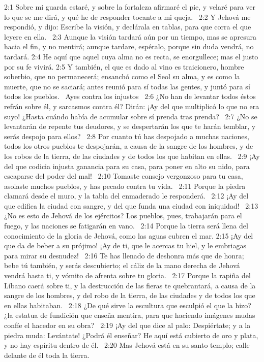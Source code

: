 2:1 Sobre mi guarda estaré, y sobre la fortaleza afirmaré el pie, y velaré para ver lo que se me dirá, y qué he de responder tocante a mi queja.  
2:2 Y Jehová me respondió, y dijo: Escribe la visión, y declárala en tablas, para que corra el que leyere en ella.  
2:3 Aunque la visión tardará aún por un tiempo, mas se apresura hacia el fin, y no mentirá; aunque tardare, espéralo, porque sin duda vendrá, no tardará. 
2:4 He aquí que aquel cuya alma no es recta, se enorgullece; mas el justo por su fe vivirá. 
2:5 Y también, el que es dado al vino es traicionero, hombre soberbio, que no permanecerá; ensanchó como el Seol su alma, y es como la muerte, que no se saciará; antes reunió para sí todas las gentes, y juntó para sí todos los pueblos.  
Ayes contra los injustos  
2:6 ¿No han de levantar todos éstos refrán sobre él, y sarcasmos contra él? Dirán: ¡Ay del que multiplicó lo que no era suyo! ¿Hasta cuándo había de acumular sobre sí prenda tras prenda?  
2:7 ¿No se levantarán de repente tus deudores, y se despertarán los que te harán temblar, y serás despojo para ellos?  
2:8 Por cuanto tú has despojado a muchas naciones, todos los otros pueblos te despojarán, a causa de la sangre de los hombres, y de los robos de la tierra, de las ciudades y de todos los que habitan en ellas.  
2:9 ¡Ay del que codicia injusta ganancia para su casa, para poner en alto su nido, para escaparse del poder del mal!  
2:10 Tomaste consejo vergonzoso para tu casa, asolaste muchos pueblos, y has pecado contra tu vida.  
2:11 Porque la piedra clamará desde el muro, y la tabla del enmaderado le responderá.  
2:12 ¡Ay del que edifica la ciudad con sangre, y del que funda una ciudad con iniquidad!  
2:13 ¿No es esto de Jehová de los ejércitos? Los pueblos, pues, trabajarán para el fuego, y las naciones se fatigarán en vano.  
2:14 Porque la tierra será llena del conocimiento de la gloria de Jehová, como las aguas cubren el mar. 
2:15 ¡Ay del que da de beber a su prójimo! ¡Ay de ti, que le acercas tu hiel, y le embriagas para mirar su desnudez!  
2:16 Te has llenado de deshonra más que de honra; bebe tú también, y serás descubierto; el cáliz de la mano derecha de Jehová vendrá hasta ti, y vómito de afrenta sobre tu gloria.  
2:17 Porque la rapiña del Líbano caerá sobre ti, y la destrucción de las fieras te quebrantará, a causa de la sangre de los hombres, y del robo de la tierra, de las ciudades y de todos los que en ellas habitaban.  
2:18 ¿De qué sirve la escultura que esculpió el que la hizo? ¿la estatua de fundición que enseña mentira, para que haciendo imágenes mudas confíe el hacedor en su obra?  
2:19 ¡Ay del que dice al palo: Despiértate; y a la piedra muda: Levántate! ¿Podrá él enseñar? He aquí está cubierto de oro y plata, y no hay espíritu dentro de él.  
2:20 Mas Jehová está en su santo templo; calle delante de él toda la tierra.  
